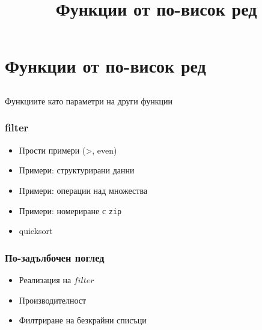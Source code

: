 \documentclass{beamer}
\begin{document}
\title[Функции от по-висок ред]{Функции от по-висок ред}
\frame{\titlepage}

\section{Функции от по-висок ред}
\subsection{}

\begin{frame}
  \centerline{Функциите като параметри на други функции}
\end{frame}

\begin{frame}[fragile]
  \frametitle{filter}

  \begin{itemize}
    \item Прости примери (>, even)
    \item Примери: структурирани данни
    \item Примери: операции над множества
    \item Примери: номериране с \verb#zip#
    \item quicksort
  \end{itemize}

\end{frame}

\begin{frame}[fragile]
  \frametitle{По-задълбочен поглед}

  \begin{itemize}
    \item Реализация на $filter$
    \item Производителност
    \item Филтриране на безкрайни списъци
  \end{itemize}

  
\end{frame}
\end{document}
